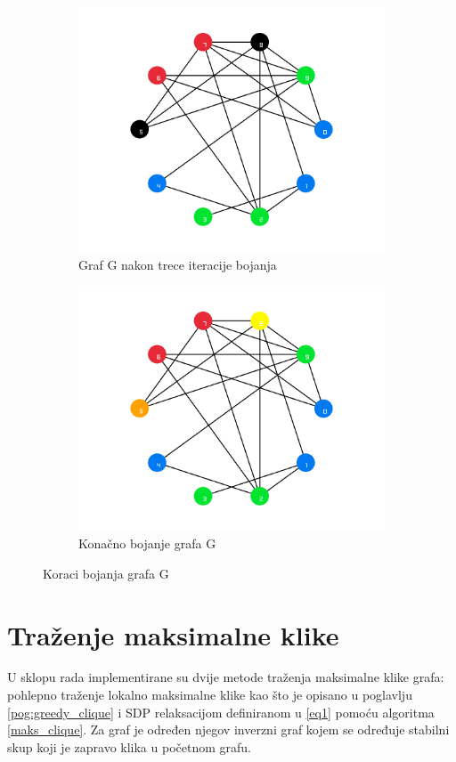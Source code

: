 \documentclass[diplomskirad]{fer}
\begin{document}
\begin{figure}
\begin{subfigure}[b]{0.4\linewidth}
    \includegraphics[scale=0.17]{images/colors_it5.png}
    \caption{Graf G nakon trece iteracije bojanja}
    \label{trece_bojanje}
  \end{subfigure}
  \begin{subfigure}[b]{0.4\linewidth}
    \includegraphics[scale=0.17]{images/colors_it7.png}
    \caption{Konačno bojanje grafa G}
    \label{zadnje_bojanje}
  \end{subfigure}
  \caption{Koraci bojanja grafa G}
\end{figure}

\newpage
\section{Traženje maksimalne klike}
U sklopu rada implementirane su dvije metode traženja maksimalne klike grafa: pohlepno traženje lokalno maksimalne klike kao što je opisano u poglavlju
\ref{pog:greedy_clique} i SDP relaksacijom definiranom u \ref{eq1} pomoću algoritma \ref{maks_clique}. Za graf je određen njegov inverzni graf kojem se
određuje stabilni skup koji je zapravo klika u početnom grafu.
\end{document}
